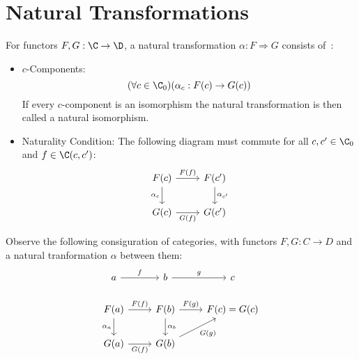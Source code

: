 \section{Natural Transformations}

\begin{definition}
  For functors $F, G:\C \to \D$, a natural transformation $\alpha : F
  \Rightarrow G$ consists of~\parencite[p.~28]{leinster:basic_category_theory}:
  \begin{itemize}
    \item $c$-Components:
      \[(\forall c\in \C_0)(\alpha_c : F(c) \to G(c))\]
      If every $c$-component is an isomorphism the natural transformation is
      then called a natural isomorphism.
    \item Naturality Condition: The following diagram must commute for all
      $c,c'\in \C_0$ and $f \in \C(c, c')$:
      \[\begin{tikzcd}[ampersand replacement=\&]
        {F(c)} \& {F(c')} \\
        {G(c)} \& {G(c')}
        \arrow["{\alpha_c}"', from=1-1, to=2-1]
        \arrow["{\alpha_{c'}}", from=1-2, to=2-2]
        \arrow["{F(f)}", from=1-1, to=1-2]
        \arrow["{G(f)}"', from=2-1, to=2-2]
      \end{tikzcd}\]
  \end{itemize}
\end{definition}

\begin{example}
  Observe the following consiguration of categories, with functors $F,G:C\to D$
  and a natural tranformation $\alpha$ between them:
  \[\begin{tikzcd}[ampersand replacement=\&]
    a \& b \& c \\
    {F(a)} \& {F(b)} \& {F(c)=G(c)} \\
    {G(a)} \& {G(b)}
    \arrow["{\alpha_a}"', from=2-1, to=3-1]
    \arrow["{\alpha_b}", from=2-2, to=3-2]
    \arrow["{F(f)}", from=2-1, to=2-2]
    \arrow["{G(f)}"', from=3-1, to=3-2]
    \arrow["f", from=1-1, to=1-2]
    \arrow["g", from=1-2, to=1-3]
    \arrow["{F(g)}", from=2-2, to=2-3]
    \arrow["{G(g)}"', from=3-2, to=2-3]
  \end{tikzcd}\]
\end{example}





